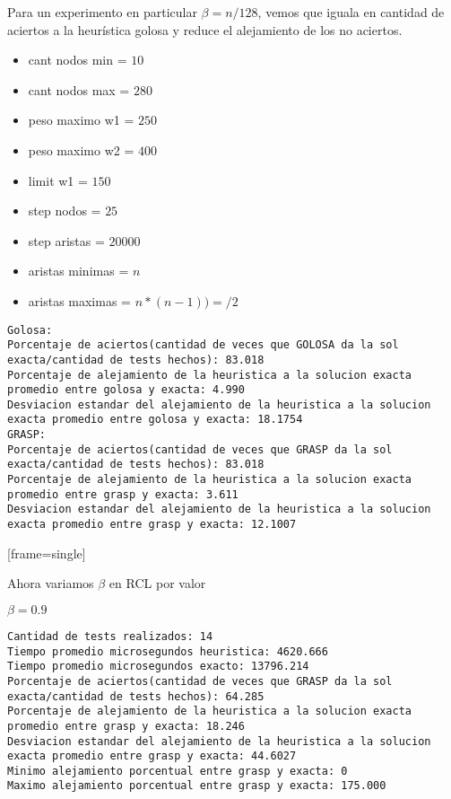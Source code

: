 Para un experimento en particular $\beta = n/128$, vemos que iguala en cantidad de aciertos a la heur\'istica golosa y reduce el alejamiento de los no aciertos.
\begin{itemize}
	\item cant nodos min = $10$
	\item cant nodos max = $280$
	\item peso maximo w1 = $250$
	\item peso maximo w2 = $400$
	\item limit w1 = $150$
	\item step nodos = $25$
	\item step aristas = $20000$
	\item aristas minimas = $n$
	\item aristas maximas = $n * (n-1))=/2$
\end{itemize}



\begin{lstlisting}[frame=single]
Golosa:
Porcentaje de aciertos(cantidad de veces que GOLOSA da la sol exacta/cantidad de tests hechos): 83.018
Porcentaje de alejamiento de la heuristica a la solucion exacta promedio entre golosa y exacta: 4.990
Desviacion estandar del alejamiento de la heuristica a la solucion exacta promedio entre golosa y exacta: 18.1754
GRASP:
Porcentaje de aciertos(cantidad de veces que GRASP da la sol exacta/cantidad de tests hechos): 83.018
Porcentaje de alejamiento de la heuristica a la solucion exacta promedio entre grasp y exacta: 3.611
Desviacion estandar del alejamiento de la heuristica a la solucion exacta promedio entre grasp y exacta: 12.1007
\end{lstlisting}[frame=single]

Ahora variamos $\beta$ en RCL por valor

$\beta = 0.9$
\begin{lstlisting}[frame=single]
Cantidad de tests realizados: 14
Tiempo promedio microsegundos heuristica: 4620.666
Tiempo promedio microsegundos exacto: 13796.214
Porcentaje de aciertos(cantidad de veces que GRASP da la sol exacta/cantidad de tests hechos): 64.285
Porcentaje de alejamiento de la heuristica a la solucion exacta promedio entre grasp y exacta: 18.246
Desviacion estandar del alejamiento de la heuristica a la solucion exacta promedio entre grasp y exacta: 44.6027
Minimo alejamiento porcentual entre grasp y exacta: 0
Maximo alejamiento porcentual entre grasp y exacta: 175.000
\end{lstlisting}

